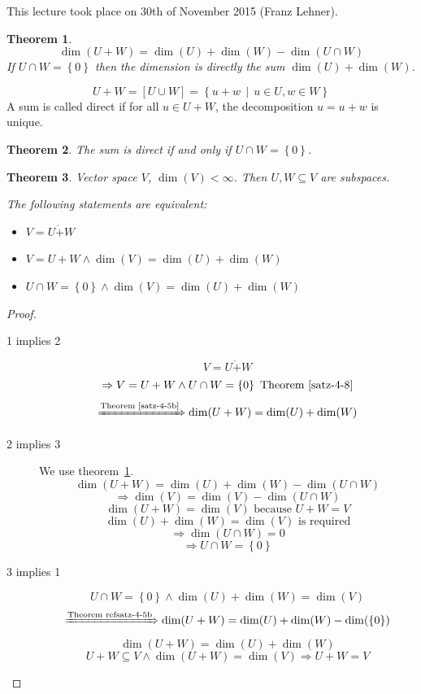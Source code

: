 \documentclass[a4paper,landscape,twocolumn]{article}
\newcommand\meta[3]{This #1 took place on #2 (#3).\par}
\newcommand\set[1]{\left\{#1\right\}}
\newcommand\setdef[2]{\left\{#1\,\middle|\,#2\right\}}
\newtheorem{theorem}{Theorem}
\begin{document}
\meta{lecture}{30th of November 2015}{Franz Lehner}
\begin{theorem}
  \label{satz-4-5b}
  \[ \dim(U + W) = \dim(U) + \dim(W) - \dim(U \cap W) \]
  If $U \cap W = \set{0}$ then the dimension is directly the sum $\dim(U) + \dim(W)$.
\end{theorem}

\[ U + W = [U \cup W] = \setdef{u+w}{u \in U, w \in W} \]
A sum is called direct if for all $u \in U + W$, the decomposition $u = u + w$ is unique.

\begin{theorem}
  The sum is direct if and only if $U \cap W = \set{0}$.
\end{theorem}

\begin{theorem}
  \label{satz-4-9}
  Vector space $V$, $\dim(V) < \infty$.
  Then $U,W \subseteq V$ are subspaces.

  The following statements are equivalent:
  \begin{itemize}
    \item $V = U \dot{+} W$
    \item $V = U + W \land \dim(V) = \dim(U) + \dim(W)$
    \item $U \cap W = \set{0} \land \dim(V) = \dim(U) + \dim(W)$
  \end{itemize}
\end{theorem}

\begin{proof}
  \begin{description}
    \item[1 implies 2]
      \[ V = U \dot{+} W \]
      \[ \Rightarrow V = U + W \land U \cap W = \set{0} \text{ Theorem~\ref{satz-4-8}} \]
      \[ \xRightarrow{\text{Theorem~\ref{satz-4-5b}}} \dim(U + W) = \dim(U) + \dim(W) \]
    \item[2 implies 3]
      We use theorem~\ref{satz-4-5b}.
      \[ \dim(U + W) = \dim(U) + \dim(W) - \dim(U \cap W) \]
      \[ \Rightarrow \dim(V) = \dim(V) - \dim(U \cap W) \]
      \[ \dim(U+W) = \dim(V) \text{ because } U + W = V \]
      \[ \dim(U) + \dim(W) = \dim(V) \text{ is required} \]
      \[ \Rightarrow \dim(U \cap W) = 0 \]
      \[ \Rightarrow U \cap W = \set{0} \]
    \item[3 implies 1]
      \[ U \cap W = \set{0} \land \dim(U) + \dim(W) = \dim(V) \]
      \[ \xRightarrow{\text{Theorem~ref{satz-4-5b}}} \dim(U+W) = \dim(U) + \dim(W) - \dim(\set{0}) \]
      \[ \dim(U+W) = \dim(U) + \dim(W) \]
      \[ U + W \subseteq V \land \dim(U+W) = \dim(V) \Rightarrow U + W = V \]
  \end{description}
\end{proof}
\end{document}
